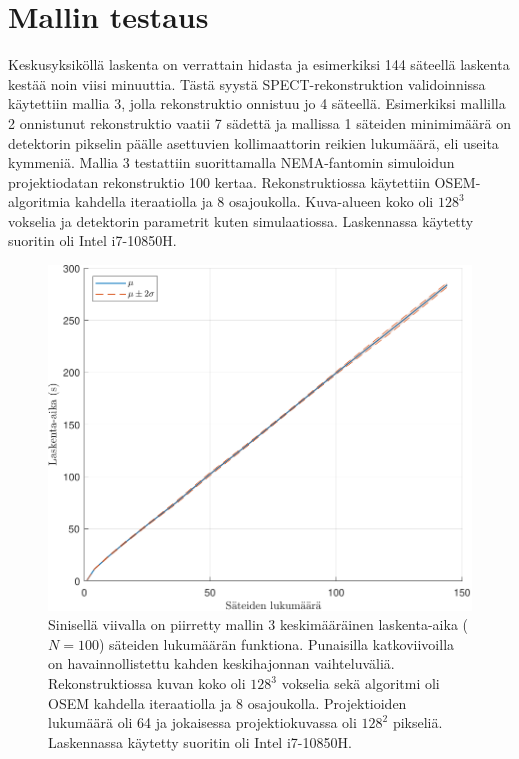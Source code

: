 \section{Mallin testaus}
Keskusyksiköllä laskenta on verrattain hidasta ja esimerkiksi 144 säteellä laskenta kestää noin viisi minuuttia. Tästä syystä SPECT-rekonstruktion validoinnissa käytettiin mallia 3, jolla rekonstruktio onnistuu jo 4 säteellä. Esimerkiksi mallilla 2 onnistunut rekonstruktio vaatii 7 sädettä ja mallissa 1 säteiden minimimäärä on detektorin pikselin päälle asettuvien kollimaattorin reikien lukumäärä, eli useita kymmeniä. Mallia 3 testattiin suorittamalla NEMA-fantomin simuloidun projektiodatan rekonstruktio 100 kertaa. Rekonstruktiossa käytettiin OSEM-algoritmia kahdella iteraatiolla ja 8 osajoukolla. Kuva-alueen koko oli $128^3$ vokselia ja detektorin parametrit kuten simulaatiossa. Laskennassa käytetty suoritin oli Intel i7-10850H.

\begin{figure}[H]
    \centering
    \captionsetup{width=.9\linewidth}
    \includegraphics[width=.9\linewidth]{kuvat/laskenta_aika.pdf}
    \caption{Sinisellä viivalla on piirretty mallin 3 keskimääräinen laskenta-aika ($N=100$) säteiden lukumäärän funktiona. Punaisilla katkoviivoilla on havainnollistettu kahden keskihajonnan vaihteluväliä. Rekonstruktiossa kuvan koko oli $128^3$ vokselia sekä algoritmi oli OSEM kahdella iteraatiolla ja 8 osajoukolla. Projektioiden lukumäärä oli 64 ja jokaisessa projektiokuvassa oli $128^2$ pikseliä. Laskennassa käytetty suoritin oli Intel i7-10850H.}
    \label{fig:laskenta_aika}
\end{figure}

